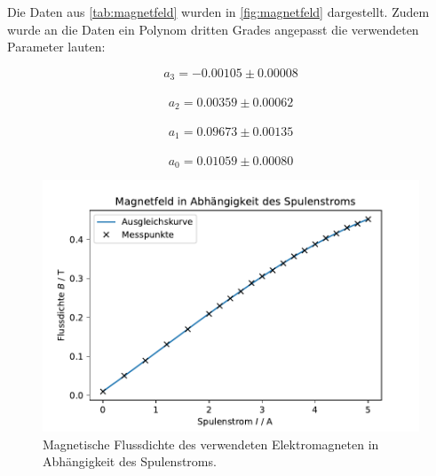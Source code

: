     Die Daten aus \autoref{tab:magnetfeld} wurden in \autoref{fig:magnetfeld} dargestellt. Zudem wurde 
    an die Daten ein Polynom dritten Grades angepasst die verwendeten Parameter lauten:
    \begin{center}
        $$a_3 = -0.00105 \pm 0.00008$$\\
        $$a_2 =  0.00359 \pm 0.00062$$\\
        $$a_1 =  0.09673 \pm 0.00135$$\\
        $$a_0 =  0.01059 \pm 0.00080$$
        
    \end{center}

    \begin{figure}
        \centering
        \includegraphics[width=1\textwidth]{content/grafiken/magnetfeld.pdf}
        \caption{Magnetische Flussdichte des verwendeten Elektromagneten in Abhängigkeit des Spulenstroms.}
        \label{fig:magnetfeld}
      \end{figure}

      
      
      
      
      
      
      
      
